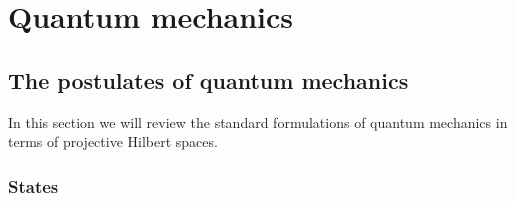 

\def\>{\rangle}
\def\<{\langle}

\newcommand{\indicator}[1][A] {\mathbf{1}_{#1}} %



\chapter{Quantum mechanics}


\section{The postulates of quantum mechanics}

In this section we will review the standard formulations of quantum mechanics in terms of projective Hilbert spaces.

\subsection{States}

